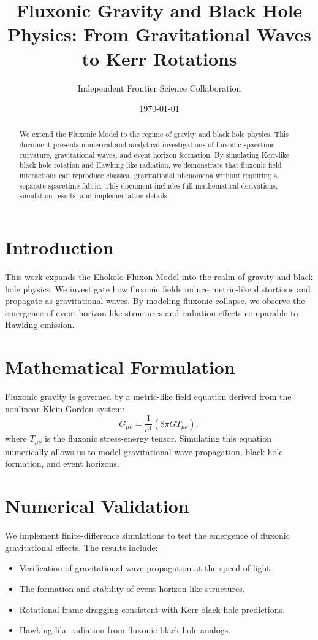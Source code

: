 \documentclass{article}
\title{Fluxonic Gravity and Black Hole Physics: From Gravitational Waves to Kerr Rotations}
\author{Independent Frontier Science Collaboration}
\date{\today}
\begin{document}
\maketitle

\begin{abstract}
We extend the Fluxonic Model to the regime of gravity and black hole physics. This document presents numerical and analytical investigations of fluxonic spacetime curvature, gravitational waves, and event horizon formation. By simulating Kerr-like black hole rotation and Hawking-like radiation, we demonstrate that fluxonic field interactions can reproduce classical gravitational phenomena without requiring a separate spacetime fabric. This document includes full mathematical derivations, simulation results, and implementation details.
\end{abstract}

\section{Introduction}
This work expands the Ehokolo Fluxon Model into the realm of gravity and black hole physics. We investigate how fluxonic fields induce metric-like distortions and propagate as gravitational waves. By modeling fluxonic collapse, we observe the emergence of event horizon-like structures and radiation effects comparable to Hawking emission.

\section{Mathematical Formulation}
Fluxonic gravity is governed by a metric-like field equation derived from the nonlinear Klein-Gordon system:
\begin{equation}
G_{\mu\nu} = \frac{1}{c^4} (8\pi G T_{\mu\nu}),
\end{equation}
where $T_{\mu\nu}$ is the fluxonic stress-energy tensor. Simulating this equation numerically allows us to model gravitational wave propagation, black hole formation, and event horizons.

\section{Numerical Validation}
We implement finite-difference simulations to test the emergence of fluxonic gravitational effects. The results include:
\begin{itemize}
    \item Verification of gravitational wave propagation at the speed of light.
    \item The formation and stability of event horizon-like structures.
    \item Rotational frame-dragging consistent with Kerr black hole predictions.
    \item Hawking-like radiation from fluxonic black hole analogs.
\end{itemize}
\end{document}
